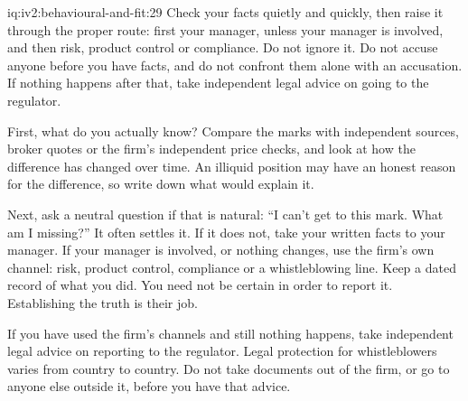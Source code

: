\begin{solution}{iq:iv2:behavioural-and-fit:29}
Check your facts quietly and quickly, then raise it through the proper route: first your manager, unless your manager is involved, and then risk, product control or compliance. Do not ignore it. Do not accuse anyone before you have facts, and do not confront them alone with an accusation. If nothing happens after that, take independent legal advice on going to the regulator.

First, what do you actually know? Compare the marks with independent sources, broker quotes or the firm's independent price checks, and look at how the difference has changed over time. An illiquid position may have an honest reason for the difference, so write down what would explain it.

Next, ask a neutral question if that is natural: ``I can't get to this mark. What am I missing?'' It often settles it. If it does not, take your written facts to your manager. If your manager is involved, or nothing changes, use the firm's own channel: risk, product control, compliance or a whistleblowing line. Keep a dated record of what you did. You need not be certain in order to report it. Establishing the truth is their job.

If you have used the firm's channels and still nothing happens, take independent legal advice on reporting to the regulator. Legal protection for whistleblowers varies from country to country. Do not take documents out of the firm, or go to anyone else outside it, before you have that advice.

\end{solution}

